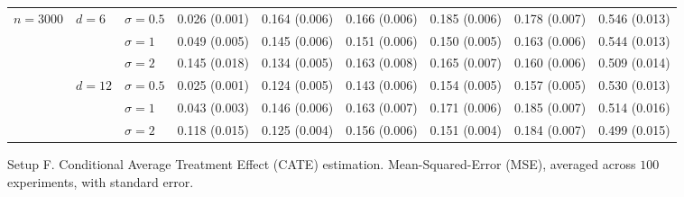\documentclass[11pt]{article} %
\theoremstyle{theorem}  %
\theoremstyle{plain}
\begin{document}
\begin{figure}[H]
\begin{tabular}{lllllllll}
\cline{1-9}
\cline{2-9}
\multirow{6}{*}{$n=3000$} & \multirow{3}{*}{$d=6$} & $\sigma=0.5$ &  0.026 (0.001) &  0.164 (0.006) &  0.166 (0.006) &  0.185 (0.006) &  0.178 (0.007) &  0.546 (0.013) \\
         &        & $\sigma=1$ &  0.049 (0.005) &  0.145 (0.006) &  0.151 (0.006) &  0.150 (0.005) &  0.163 (0.006) &  0.544 (0.013) \\
         &        & $\sigma=2$ &  0.145 (0.018) &  0.134 (0.005) &  0.163 (0.008) &  0.165 (0.007) &  0.160 (0.006) &  0.509 (0.014) \\
\cline{2-9}
         & \multirow{3}{*}{$d=12$} & $\sigma=0.5$ &  0.025 (0.001) &  0.124 (0.005) &  0.143 (0.006) &  0.154 (0.005) &  0.157 (0.005) &  0.530 (0.013) \\
         &        & $\sigma=1$ &  0.043 (0.003) &  0.146 (0.006) &  0.163 (0.007) &  0.171 (0.006) &  0.185 (0.007) &  0.514 (0.016) \\
         &        & $\sigma=2$ &  0.118 (0.015) &  0.125 (0.004) &  0.156 (0.006) &  0.151 (0.004) &  0.184 (0.007) &  0.499 (0.015) \\
\bottomrule
\end{tabular}

\caption{Setup F. Conditional Average Treatment Effect (CATE) estimation. Mean-Squared-Error (MSE), averaged across $100$ experiments, with standard error.}
\label{fig:setupF-cate}
\end{figure}
 
\end{document}
